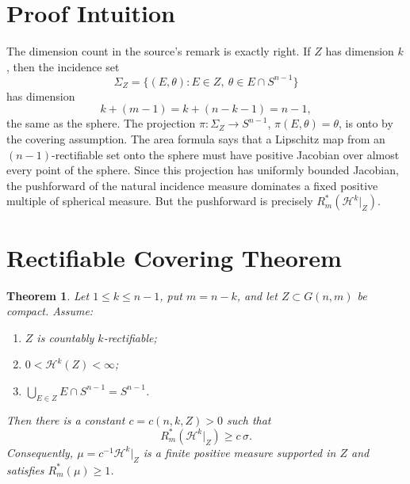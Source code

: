 \documentclass[11pt]{article}
\newtheorem{theorem}{Theorem}
\newcommand{\HH}{\mathcal H}
\begin{document}
\section*{Proof Intuition}

The dimension count in the source's remark is exactly right. If \(Z\) has
dimension \(k\), then the incidence set
\[
  \Sigma_Z=\{(E,\theta):E\in Z,\ \theta\in E\cap S^{n-1}\}
\]
has dimension
\[
  k+(m-1)=k+(n-k-1)=n-1,
\]
the same as the sphere. The projection
\(\pi:\Sigma_Z\to S^{n-1}\), \(\pi(E,\theta)=\theta\), is onto by the covering
assumption. The area formula says that a Lipschitz map from an
\((n-1)\)-rectifiable set onto the sphere must have positive Jacobian over
almost every point of the sphere. Since this projection has uniformly bounded
Jacobian, the pushforward of the natural incidence measure dominates a fixed
positive multiple of spherical measure. But the pushforward is precisely
\(R_m^*(\HH^k|_Z)\).

\section*{Rectifiable Covering Theorem}

\begin{theorem}
\label{thm:rectifiable-cover}
Let \(1\leq k\leq n-1\), put \(m=n-k\), and let
\(Z\subset G(n,m)\) be compact. Assume:
\begin{enumerate}
\item \(Z\) is countably \(k\)-rectifiable;
\item \(0<\HH^k(Z)<\infty\);
\item \(\bigcup_{E\in Z} E\cap S^{n-1}=S^{n-1}\).
\end{enumerate}
Then there is a constant \(c=c(n,k,Z)>0\) such that
\[
  R_m^*(\HH^k|_Z)\geq c\,\sigma .
\]
Consequently, \(\mu=c^{-1}\HH^k|_Z\) is a finite positive measure supported in
\(Z\) and satisfies \(R_m^*(\mu)\geq 1\).
\end{theorem}
\end{document}
